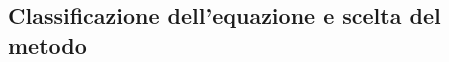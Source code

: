 \subsection{Classificazione dell'equazione e scelta del metodo}
\label{sec:esercizi-equazioni-differenziali-classificazione-equazioni}
